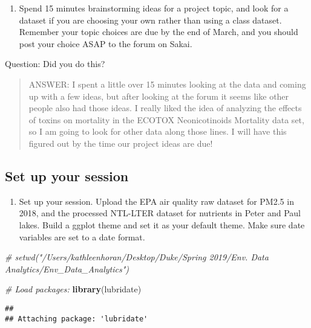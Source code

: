 \documentclass[]{article}
\newenvironment{Shaded}{\begin{snugshade}}{\end{snugshade}}
\newcommand{\KeywordTok}[1]{\textcolor[rgb]{0.13,0.29,0.53}{\textbf{#1}}}
\newcommand{\CommentTok}[1]{\textcolor[rgb]{0.56,0.35,0.01}{\textit{#1}}}
\newcommand{\NormalTok}[1]{#1}
\providecommand{\tightlist}{%
  \setlength{\itemsep}{0pt}\setlength{\parskip}{0pt}}
\begin{document}
\begin{enumerate}
\def\labelenumi{\arabic{enumi}.}
\tightlist
\item
  Spend 15 minutes brainstorming ideas for a project topic, and look for
  a dataset if you are choosing your own rather than using a class
  dataset. Remember your topic choices are due by the end of March, and
  you should post your choice ASAP to the forum on Sakai.
\end{enumerate}

Question: Did you do this?

\begin{quote}
ANSWER: I spent a little over 15 minutes looking at the data and coming
up with a few ideas, but after looking at the forum it seems like other
people also had those ideas. I really liked the idea of analyzing the
effects of toxins on mortality in the ECOTOX Neonicotinoids Mortality
data set, so I am going to look for other data along those lines. I will
have this figured out by the time our project ideas are due!
\end{quote}

\subsection{Set up your session}\label{set-up-your-session}

\begin{enumerate}
\def\labelenumi{\arabic{enumi}.}
\setcounter{enumi}{1}
\tightlist
\item
  Set up your session. Upload the EPA air quality raw dataset for PM2.5
  in 2018, and the processed NTL-LTER dataset for nutrients in Peter and
  Paul lakes. Build a ggplot theme and set it as your default theme.
  Make sure date variables are set to a date format.
\end{enumerate}

\begin{Shaded}
\begin{Highlighting}[]
\CommentTok{# setwd("/Users/kathleenhoran/Desktop/Duke/Spring 2019/Env. Data Analytics/Env_Data_Analytics")}

\CommentTok{# Load packages:}
\KeywordTok{library}\NormalTok{(lubridate)}
\end{Highlighting}
\end{Shaded}

\begin{verbatim}
## 
## Attaching package: 'lubridate'
\end{verbatim}
\end{document}

